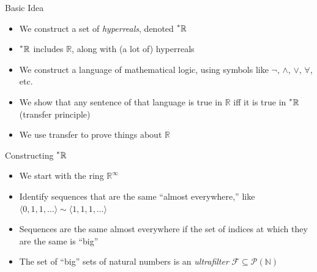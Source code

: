 \documentclass{beamer}
\theoremstyle{plain}
\theoremstyle{definition}
\newcommand{\reals}{\mathbb{R}}
\newcommand{\hreals}{\prescript{*}{}{\mathbb{R}}}
\begin{document}
\begin{frame}{Basic Idea}
\begin{itemize}
\setlength{\itemsep}{8pt}
	\item We construct a set of \textit{hyperreals}, denoted $\hreals$
	\item $\hreals$ includes $\reals$, along with (a lot of) hyperreals
	\item We construct a language of mathematical logic, using symbols like $\neg$, $\land$, $\lor$, $\forall$, etc.
	\item We show that any sentence of that language is true in $\reals$ iff it is true in $\hreals$ (transfer principle)
	\item We use transfer to prove things about $\reals$
\end{itemize}
\end{frame}

\begin{frame}{Constructing $\hreals$}
\begin{itemize}
\setlength{\itemsep}{8pt}
	\item We start with the ring $\reals^\infty$
	\item Identify sequences that are the same ``almost everywhere,'' like $\langle 0, 1, 1, \ldots \rangle \sim \langle 1, 1, 1, \ldots \rangle$
	\item Sequences are the same almost everywhere if the set of indices at which they are the same is ``big''
	\item The set of ``big'' sets of natural numbers is an \textit{ultrafilter} $\mathcal{F} \subseteq \mathcal{P}(\mathbb{N})$
\end{itemize}
\end{frame}
\end{document}
